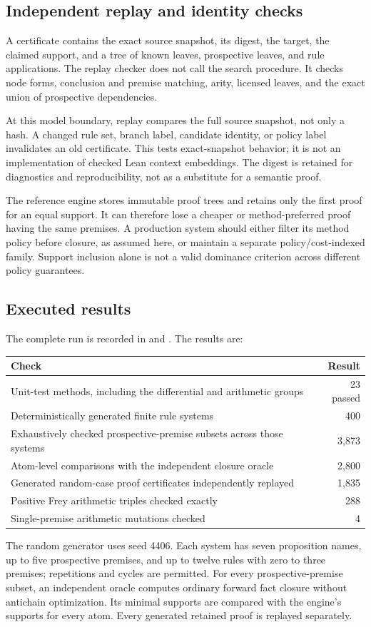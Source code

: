 \documentclass[11pt,a4paper]{article}
\newcommand{\code}[1]{\texttt{\detokenize{#1}}}
\theoremstyle{definition}\newtheorem{definition}[theorem]{Definition}
\theoremstyle{remark}\newtheorem{remark}[theorem]{Remark}
\begin{document}
\subsection{Independent replay and identity checks}
A certificate contains the exact source snapshot, its digest, the target, the claimed support, and a tree of known leaves, prospective leaves, and rule applications. The replay checker does not call the search procedure. It checks node forms, conclusion and premise matching, arity, licensed leaves, and the exact union of prospective dependencies.

At this model boundary, replay compares the full source snapshot, not only a hash. A changed rule set, branch label, candidate identity, or policy label invalidates an old certificate. This tests exact-snapshot behavior; it is not an implementation of checked Lean context embeddings. The digest is retained for diagnostics and reproducibility, not as a substitute for a semantic proof.

The reference engine stores immutable proof trees and retains only the first proof for an equal support. It can therefore lose a cheaper or method-preferred proof having the same premises. A production system should either filter its method policy before closure, as assumed here, or maintain a separate policy/cost-indexed family. Support inclusion alone is not a valid dominance criterion across different policy guarantees.

\subsection{Executed results}
The complete run is recorded in \code{evidence/results.json} and \code{evidence/test.log}. The results are:
\begin{center}\small
\begin{tabularx}{\textwidth}{@{}Y r@{}}
\toprule Check & Result\\\midrule
Unit-test methods, including the differential and arithmetic groups & 23 passed\\
Deterministically generated finite rule systems & 400\\
Exhaustively checked prospective-premise subsets across those systems & 3,873\\
Atom-level comparisons with the independent closure oracle & 2,800\\
Generated random-case proof certificates independently replayed & 1,835\\
Positive Frey arithmetic triples checked exactly & 288\\
Single-premise arithmetic mutations checked & 4\\
\bottomrule
\end{tabularx}
\end{center}
The random generator uses seed 4406. Each system has seven proposition names, up to five prospective premises, and up to twelve rules with zero to three premises; repetitions and cycles are permitted. For every prospective-premise subset, an independent oracle computes ordinary forward fact closure without antichain optimization. Its minimal supports are compared with the engine's supports for every atom. Every generated retained proof is replayed separately.
\end{document}
